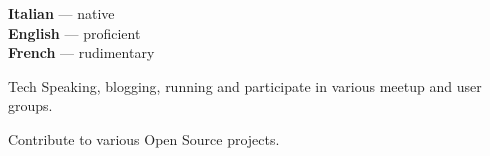 \documentclass[9pt]{developercv}
\begin{document}

\begin{minipage}[t]{0.3\textwidth}
	\vspace{-\baselineskip}


	\textbf{Italian} --- native\\
	\textbf{English} --- proficient\\
	\textbf{French} --- rudimentary
\end{minipage}
\hfill
\begin{minipage}[t]{0.3\textwidth}
	\vspace{-\baselineskip}


	Tech Speaking, blogging, running and participate in various meetup and user groups.
\end{minipage}
\hfill
\begin{minipage}[t]{0.3\textwidth}
	\vspace{-\baselineskip}


	Contribute to various Open Source projects.
\end{minipage}

\end{document}

